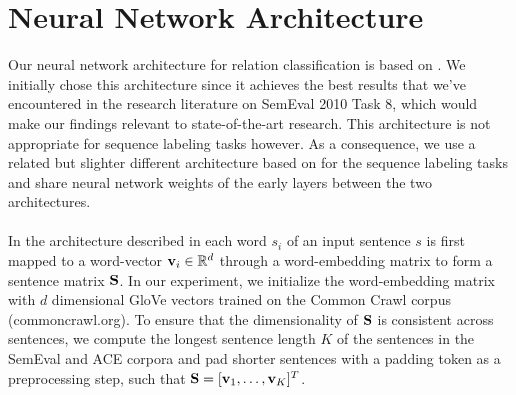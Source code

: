 \section{Neural Network Architecture}
\label{network_architecture}
Our neural network architecture for relation classification is based on \citet{nguyen2015}. We initially chose this architecture since it achieves the best results that we've encountered in the research literature on SemEval 2010 Task 8, which would make our findings relevant to state-of-the-art research. This architecture is not appropriate for sequence labeling tasks however. As a consequence, we use a related but slighter different architecture based on \citet{collobert2011} for the sequence labeling tasks and share neural network weights of the early layers between the two architectures.
\\\\
In the architecture described in \citet{nguyen2015} each word $s_i$ of an input sentence $s$ is first mapped to a word-vector $\mathbf{v}_i \in \mathbb{R}^d$ through a word-embedding matrix to form a sentence matrix $\mathbf{S}$. In our experiment, we initialize the word-embedding matrix with $d$ dimensional GloVe vectors trained on the Common Crawl corpus (commoncrawl.org). To ensure that the dimensionality of $\mathbf{S}$ is consistent across sentences, we compute the longest sentence length $K$ of the sentences in the SemEval and ACE corpora and pad shorter sentences with a padding token as a preprocessing step, such that $\mathbf{S} = [\mathbf{v}_1, \dots, \mathbf{v}_K]^T$.

